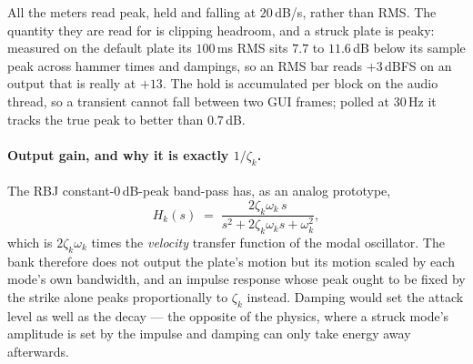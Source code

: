 \documentclass[11pt,a4paper]{article}
\begin{document}
All the meters read peak, held and falling at $20$\,dB/s, rather than RMS.
The quantity they are read for is clipping headroom, and a struck plate is
peaky: measured on the default plate its $100$\,ms RMS sits $7.7$ to
$11.6$\,dB below its sample peak across hammer times and dampings, so an
RMS bar reads $+3$\,dBFS on an output that is really at $+13$. The hold is
accumulated per block on the audio thread, so a transient cannot fall
between two GUI frames; polled at $30$\,Hz it tracks the true peak to
better than $0.7$\,dB.

\paragraph{Output gain, and why it is exactly $1/\zeta_k$.}
The RBJ constant-$0$\,dB-peak band-pass has, as an analog prototype,
%
\begin{equation}
  H_k(s) \;=\; \frac{2\zeta_k\omega_k\, s}{s^2 + 2\zeta_k\omega_k s + \omega_k^2},
  \label{eq:bpf}
\end{equation}
%
which is $2\zeta_k\omega_k$ times the \emph{velocity} transfer function of
the modal oscillator. The bank therefore does not output the plate's motion
but its motion scaled by each mode's own bandwidth, and an impulse response
whose peak ought to be fixed by the strike alone peaks proportionally to
$\zeta_k$ instead. Damping would set the attack level as well as the decay
--- the opposite of the physics, where a struck mode's amplitude is set by
the impulse and damping can only take energy away afterwards.
\end{document}
